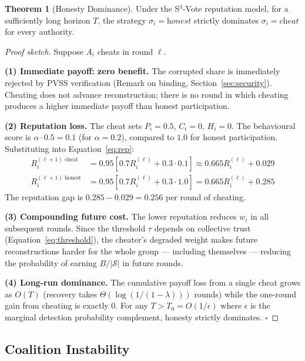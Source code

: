 \documentclass[12pt,a4paper]{article}
\theoremstyle{definition}
\newtheorem{theorem}{Theorem}[section]
\theoremstyle{remark}
\begin{document}
\begin{theorem}[Honesty Dominance]
\label{thm:dominance}
  Under the S$^3$-Vote reputation model, for a sufficiently long
  horizon $T$, the strategy $\sigma_i = \textit{honest}$ strictly
  dominates $\sigma_i = \textit{cheat}$ for every authority.
\end{theorem}

\begin{proof}[Proof sketch]
  Suppose $A_i$ cheats in round $\ell$.

  \textbf{(1) Immediate payoff: zero benefit.}
  The corrupted share is immediately rejected by PVSS verification
  (Remark on binding, Section~\ref{sec:security}).
  Cheating does not advance reconstruction; there is no round in which
  cheating produces a higher immediate payoff than honest participation.

  \textbf{(2) Reputation loss.}
  The cheat sets $P_i = 0.5$, $C_i = 0$, $H_i = 0$.
  The behavioural score is $\alpha \cdot 0.5 = 0.1$ (for $\alpha = 0.2$),
  compared to $1.0$ for honest participation.
  Substituting into Equation~\eqref{eq:rep}:
  \begin{align*}
    R_i^{(\ell+1)\text{ cheat}}  &= 0.95[0.7 R_i^{(\ell)} + 0.3 \cdot 0.1]
      \approx 0.665 R_i^{(\ell)} + 0.029 \\
    R_i^{(\ell+1)\text{ honest}} &= 0.95[0.7 R_i^{(\ell)} + 0.3 \cdot 1.0]
      = 0.665 R_i^{(\ell)} + 0.285
  \end{align*}
  The reputation gap is $0.285 - 0.029 = 0.256$ per round of cheating.

  \textbf{(3) Compounding future cost.}
  The lower reputation reduces $w_i$ in all subsequent rounds.
  Since the threshold $\tau$ depends on collective trust
  (Equation~\eqref{eq:threshold}), the cheater's degraded weight makes
  future reconstructions harder for the whole group — including themselves —
  reducing the probability of earning $B/|\mathcal{S}|$ in future rounds.

  \textbf{(4) Long-run dominance.}
  The cumulative payoff loss from a single cheat grows as $O(T)$
  (recovery takes $\Theta(\log(1/(1-\lambda)))$ rounds) while the
  one-round gain from cheating is exactly 0.
  For any $T > T_0 = O(1/\epsilon)$ where $\epsilon$ is the marginal
  detection probability complement, honesty strictly dominates.
  \hfill$\square$
\end{proof}

\subsection{Coalition Instability}
\end{document}
